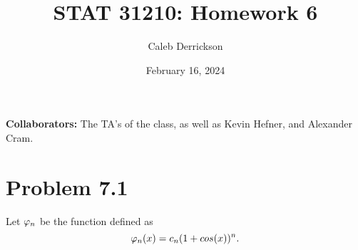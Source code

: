 

\title{STAT 31210: Homework 6}
\author{Caleb Derrickson}
\date{February 16, 2024}


\onehalfspacing
\maketitle
\allowdisplaybreaks
{\color{cit}\vspace{2mm}\noindent\textbf{Collaborators:}} The TA's of the class, as well as Kevin Hefner, and Alexander Cram.

\tableofcontents

\newcommand{\scP}{\mathcal{P}}
\newcommand{\scT}{\mathbb{T}}
\newcommand{\into}{\rightarrow}
\newcommand{\scM}{\mathcal{M}}
\newcommand{\scH}{\mathcal{H}}
\newcommand{\scN}{\mathcal{N}}
\newcommand{\scV}{\mathcal{V}}
\newcommand{\scW}{\mathcal{W}}
\renewcommand{\grad}{\nabla}
\renewcommand{\star}{^{*}}

\newpage
\section{Problem 7.1}
Let $\varphi_n$ be the function defined as
\[\varphi_n(x) = c_n(1 + cos(x))^n.\]

